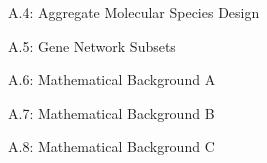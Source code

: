 \documentclass[final]{beamer}
\newlength{\onecolwid}
\theoremstyle{definition}
\begin{document}
\begin{frame}[t]
\begin{columns}[t]
\begin{column}{\onecolwid}
\begin{alertblock}{A.4: Aggregate Molecular Species Design}

\end{alertblock}


\begin{alertblock}{A.5: Gene Network Subsets}

\end{alertblock}

\begin{alertblock}{A.6: Mathematical Background A}

\end{alertblock}


\begin{alertblock}{A.7: Mathematical Background B}

\end{alertblock}


\begin{alertblock}{A.8: Mathematical Background C}
	

\end{alertblock}


\end{column} %


\end{columns}
\end{frame}
\end{document}
